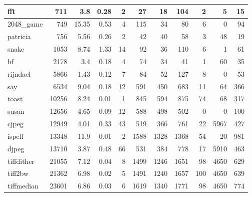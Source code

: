 \begin{tabular}{l|r|r|r|r|r|r|r|r|r|r}
 \hline
 fft             &            711 &     3.8  &   0.28 &    2 &     27 &         18 &          104 &     2 &     5 &    15 \\
 \hline
 2048\_game       &            749 &    15.35 &   0.53 &    4 &    115 &         34 &           80 &     6 &     0 &    94 \\
 \hline
 patricia        &            756 &     5.56 &   0.26 &    2 &     42 &         40 &           58 &     3 &    48 &    19 \\
 \hline
 snake           &           1053 &     8.74 &   1.33 &   14 &     92 &         36 &          110 &     6 &     1 &    61 \\
 \hline
 bf              &           2178 &     3.4  &   0.18 &    4 &     74 &         34 &           41 &     1 &    60 &    35 \\
 \hline
 rijndael        &           5866 &     1.43 &   0.12 &    7 &     84 &         52 &          127 &     8 &     0 &    53 \\
 \hline
 say             &           6534 &     9.04 &   0.18 &   12 &    591 &        450 &          683 &    11 &    64 &   366 \\
 \hline
 toast           &          10256 &     8.24 &   0.01 &    1 &    845 &        594 &          875 &    74 &    68 &   317 \\
 \hline
 susan           &          12656 &     4.65 &   0.09 &   12 &    588 &        498 &          502 &     0 &     0 &   100 \\
 \hline
 cjpeg           &          12949 &     4.01 &   0.33 &   43 &    519 &        366 &          761 &    22 &  5967 &   427 \\
 \hline
 ispell          &          13348 &    11.9  &   0.01 &    2 &   1588 &       1328 &         1368 &    54 &    20 &   981 \\
 \hline
 djpeg           &          13710 &     3.87 &   0.48 &   66 &    531 &        384 &          778 &    17 &  5910 &   463 \\
 \hline
 tiffdither      &          21055 &     7.12 &   0.04 &    8 &   1499 &       1246 &         1651 &    98 &  4650 &   629 \\
 \hline
 tiff2bw         &          21362 &     6.98 &   0.02 &    5 &   1491 &       1240 &         1657 &   100 &  4650 &   639 \\
 \hline
 tiffmedian      &          23601 &     6.86 &   0.03 &    6 &   1619 &       1340 &         1771 &    98 &  4650 &   774 \\
\hline
\end{tabular}


